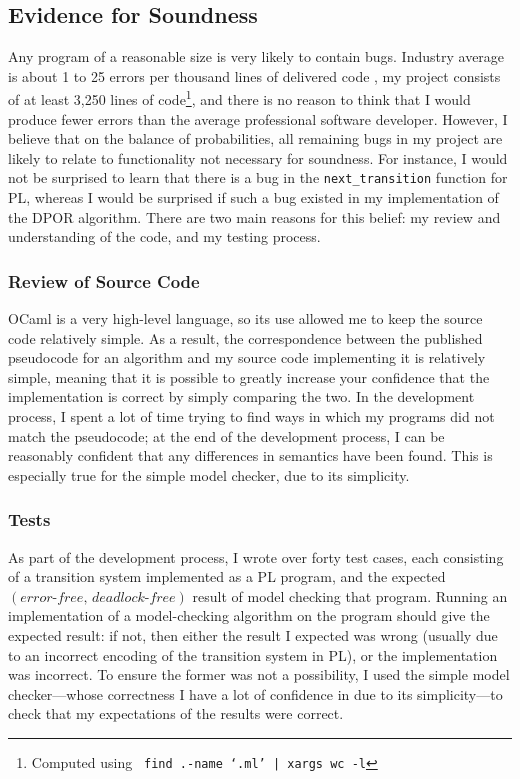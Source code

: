 \documentclass[12pt,a4paper,twoside,openright]{report}
\begin{document}
\subsection{Evidence for Soundness}
Any program of a reasonable size is very
likely to contain bugs. Industry average
is about 1 to 25 errors per thousand lines
of delivered code \cite{mccon04}, my project
consists of at least 3,250 lines of
code\footnote{Computed using
	\texttt{\,find .\@ -name
		\textquoteleft*.ml\textquoteright
		| xargs wc -l}},
and there is no reason to think that I would
produce fewer errors than the average
professional software developer.
However, I believe that
on the balance of probabilities,
all remaining bugs in my project
are likely to relate
to functionality not necessary for
soundness. For instance, I would
not be surprised to learn that there
is a bug in the \texttt{next\_transition}
function for PL, whereas I would be
surprised if such a bug existed in
my implementation of the DPOR
algorithm. There are two main reasons
for this belief: my review and understanding
of the code, and my testing process.

\subsubsection{Review of Source Code}
OCaml is a very high-level language, so
its use allowed me to keep the source code
relatively simple. As a result,
the correspondence between
the published pseudocode for an algorithm
and my source code implementing it is
relatively simple, meaning that it
is possible to greatly increase
your confidence that
the implementation is correct by simply
comparing the two. In the development
process, I spent a lot of time trying
to find ways in which my programs did
not match the pseudocode; at the end
of the development process, I can be
reasonably confident that any differences
in semantics have been found.
This is especially
true for the simple model checker,
due to its simplicity.

\subsubsection{Tests}
\label{sec:pl-checker-tests}
As part of the development process,
I wrote over forty test cases, each
consisting of a transition system
implemented as a PL program, and
the expected
$(\textit{error-free},\, \textit{deadlock-free})$
result of model checking that program.
Running an implementation of a
model-checking algorithm on the
program should give the expected
result: if not, then either
the result I expected was wrong
(usually due to an incorrect encoding
of the transition system in PL),
or the implementation was incorrect.
To ensure the former was not a possibility,
I used the simple model checker---whose
correctness I have a lot of confidence in due
to its simplicity---to check that my
expectations of the results were correct.
\end{document}
